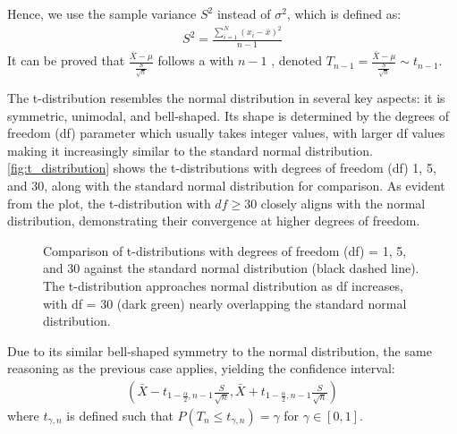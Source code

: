 \begin{enumerate}
    Hence, we use the sample variance \( S^2 \) instead of \( \sigma^2 \), which is defined as:
    \begin{gather*}
        S^2 = \frac{\sum_{i = 1}^{N}(x_i - \bar{x})^2}{n - 1}
    \end{gather*}
    It can be proved that \( \frac{\bar{X} - \mu}{\frac{S}{\sqrt{n}}} \) follows a  with \( n - 1 \) ,
    denoted \( T_{n - 1} = \frac{\bar{X} - \mu}{\frac{S}{\sqrt{n}}} \sim t_{n - 1} \).

    The t-distribution resembles the normal distribution in several key aspects: it is symmetric, unimodal, and bell-shaped.
    Its shape is determined by the degrees of freedom (df) parameter which usually takes integer values, with larger df values making it increasingly similar to the standard normal distribution.
    \autoref{fig:t_distribution} shows the t-distributions with degrees of freedom (df) 1, 5, and 30, along with the standard normal distribution for comparison.
    As evident from the plot, the t-distribution with \( df \geq 30 \) closely aligns with the normal distribution, demonstrating their convergence at higher degrees of freedom.
    \begin{figure}[t]
    \begin{center}
    \end{center}
    \caption{Comparison of t-distributions with degrees of freedom (df) = 1, 5, and 30 against the standard normal distribution (black dashed line). The t-distribution approaches normal distribution as df increases, with df = 30 (dark green) nearly overlapping the standard normal distribution.}
    \label{fig:t_distribution}
    \end{figure}

    Due to its similar bell-shaped symmetry to the normal distribution, the same reasoning as the previous case applies, yielding the confidence interval:
    \begin{gather*}
        (\bar{X} - t_{1 - \frac{\alpha}{2}, n - 1}\frac{S}{\sqrt{n}}, \bar{X} + t_{1 - \frac{\alpha}{2}, n - 1}\frac{S}{\sqrt{n}})
    \end{gather*}
    where \( t_{\gamma, n} \) is defined such that \( P(T_{n} \leq t_{\gamma, n}) = \gamma \) for \( \gamma \in [0, 1] \).
\end{enumerate}
